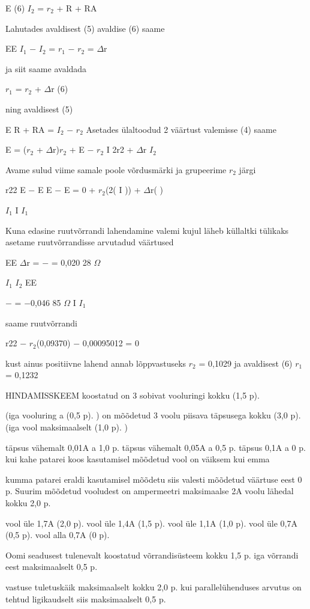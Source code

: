 E (6) $I_2$ = $r_2$ + R + RA

Lahutades avaldisest (5) avaldise (6) saame

EE $I_1$ $-$ $I_2$ = $r_1$ $-$ $r_2$ = $\Delta$r

ja siit saame avaldada

$r_1$ = $r_2$ + $\Delta$r (6)

ning avaldisest (5)

E R + RA = $I_2$ $-$ $r_2$ Asetades ülaltoodud 2 väärtust valemisse (4) saame

E = ($r_2$ + $\Delta$r)$r_2$ + E $-$ $r_2$ I 2r2 + $\Delta$r $I_2$

Avame sulud viime samale poole võrdusmärki ja grupeerime $r_2$ järgi

r22 E $-$ E E $-$ E = 0 + $r_2$(2( I )) + $\Delta$r( )

$I_1$ I $I_1$

Kuna edasine ruutvõrrandi lahendamine valemi kujul läheb küllaltki tülikaks asetame ruutvõrrandisse arvutadud väärtused

EE $\Delta$r = $-$ = 0,020 28 $\Omega$

$I_1$ $I_2$ EE

$-$ = $-$0,046 85 $\Omega$ I $I_1$

saame ruutvõrrandi

r22 $-$ $r_2$(0,09370) $-$ 0,00095012 = 0

kust ainus positiivne lahend annab lõppvastuseks $r_2$ = 0,1029 ja avaldisest (6) $r_1$ = 0,1232

HINDAMISSKEEM koostatud on 3 sobivat vooluringi kokku (1,5 p).

(iga vooluring a (0,5 p). ) on mõõdetud 3 voolu piisava täpsusega kokku (3,0 p). (iga vool maksimaalselt (1,0 p). )

täpsus vähemalt 0,01A a 1,0 p. täpsus vähemalt 0,05A a 0,5 p. täpsus 0,1A a 0 p. kui kahe patarei koos kasutamisel mõõdetud vool on väiksem kui emma

kumma patarei eraldi kasutamisel mõõdetu siis valesti mõõdetud väärtuse eest 0 p. Suurim mõõdetud vooludest on ampermeetri maksimaalse 2A voolu lähedal kokku 2,0 p.

vool üle 1,7A (2,0 p). vool üle 1,4A (1,5 p). vool üle 1,1A (1,0 p). vool üle 0,7A (0,5 p). vool alla 0,7A (0 p).

Oomi seadusest tulenevalt koostatud võrrandisüsteem kokku 1,5 p. iga võrrandi eest maksimaalselt 0,5 p.

vastuse tuletuskäik maksimaalselt kokku 2,0 p. kui parallelühenduses arvutus on tehtud ligikaudselt siis maksimaalselt 0,5 p.


